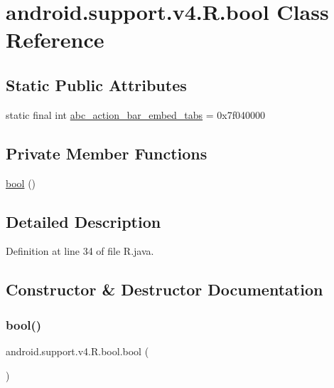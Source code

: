 \hypertarget{classandroid_1_1support_1_1v4_1_1_r_1_1bool}{}\section{android.\+support.\+v4.\+R.\+bool Class Reference}
\label{classandroid_1_1support_1_1v4_1_1_r_1_1bool}
\subsection*{Static Public Attributes}
\begin{DoxyCompactItemize}
\item 
static final int \mbox{\hyperlink{classandroid_1_1support_1_1v4_1_1_r_1_1bool_ae48329695247e01d9540cb1c14ff19b0}{abc\+\_\+action\+\_\+bar\+\_\+embed\+\_\+tabs}} = 0x7f040000
\end{DoxyCompactItemize}
\subsection*{Private Member Functions}
\begin{DoxyCompactItemize}
\item 
\mbox{\hyperlink{classandroid_1_1support_1_1v4_1_1_r_1_1bool_ad5554a0830f86924cf9209031fb8abe4}{bool}} ()
\end{DoxyCompactItemize}


\subsection{Detailed Description}


Definition at line 34 of file R.\+java.



\subsection{Constructor \& Destructor Documentation}
\mbox{\label{classandroid_1_1support_1_1v4_1_1_r_1_1bool_ad5554a0830f86924cf9209031fb8abe4}} 
\subsubsection{\texorpdfstring{bool()}{bool()}}
{\footnotesize\ttfamily android.\+support.\+v4.\+R.\+bool.\+bool (\begin{DoxyParamCaption}{ }\end{DoxyParamCaption})\hspace{0.3cm}{\ttfamily [private]}}



